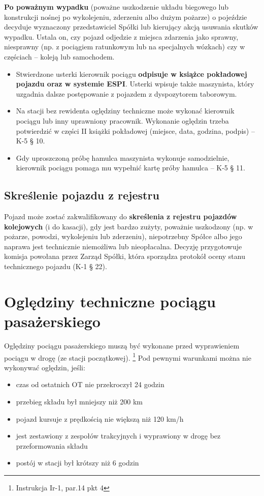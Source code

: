 \textbf{Po poważnym wypadku} (poważne uszkodzenie układu biegowego lub konstrukcji nośnej po wykolejeniu, zderzeniu albo dużym pożarze) o pojeździe decyduje wyznaczony przedstawiciel Spółki lub kierujący akcją usuwania skutków wypadku. Ustala on, czy pojazd odjedzie z miejsca zdarzenia jako sprawny, niesprawny (np. z pociągiem ratunkowym lub na specjalnych wózkach) czy w częściach – koleją lub samochodem.

\begin{tcolorbox}[colback=yellow!10!white,colframe=orange!80!black,title=Dla kierownika pociągu]
	\begin{itemize}
		\item Stwierdzone usterki kierownik pociągu \textbf{odpisuje w książce pokładowej pojazdu oraz w systemie ESPI}. Usterki wpisuje także maszynista, który uzgadnia dalsze postępowanie z pojazdem z dyspozytorem taborowym.
		\item Na stacji bez rewidenta oględziny techniczne może wykonać kierownik pociągu lub inny uprawniony pracownik. Wykonanie oględzin trzeba potwierdzić w części II książki pokładowej (miejsce, data, godzina, podpis) – K-5 § 10.
		\item Gdy uproszczoną próbę hamulca maszynista wykonuje samodzielnie, kierownik pociągu pomaga mu wypełnić kartę próby hamulca – K-5 § 11.
	\end{itemize}
\end{tcolorbox}

\section{Skreślenie pojazdu z rejestru}

Pojazd może zostać zakwalifikowany do \textbf{skreślenia z rejestru pojazdów kolejowych} (i do kasacji), gdy jest bardzo zużyty, poważnie uszkodzony (np. w pożarze, powodzi, wykolejeniu lub zderzeniu), niepotrzebny Spółce albo jego naprawa jest technicznie niemożliwa lub nieopłacalna. Decyzję przygotowuje komisja powołana przez Zarząd Spółki, która sporządza protokół oceny stanu technicznego pojazdu (K-1 § 22).


\chapter{Oględziny techniczne pociągu pasażerskiego}

Oględziny pociągu pasażerskiego muszą być wykonane przed wyprawieniem pociągu w drogę (ze stacji początkowej). \footnote{Instrukcja Ir-1, par.14 pkt 4} Pod pewnymi warunkami można nie wykonywać oględzin, jeśli:
\begin{itemize}
	\item czas od ostatnich OT nie przekroczył 24 godzin
	\item przebieg składu był mniejszy niż 200 km
	\item pojazd kursuje z prędkością nie większą niż 120 km/h
	\item jest zestawiony z zespołów trakcyjnych i wyprawiony w drogę bez przeformowania składu
	\item postój w stacji był krótszy niż 6 godzin
\end{itemize}

